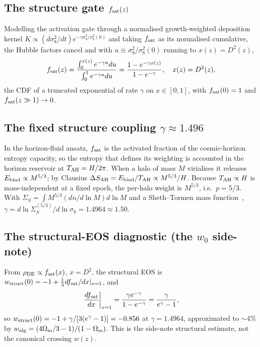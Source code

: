 \subsection{The structure gate $f_{\mathrm{sat}}(z)$}
Modelling the activation gate through a normalised growth-weighted deposition kernel $K\propto
(d\sigma_8^2/dt)e^{-\gamma\sigma_8^2/\sigma_8^2(0)}$ and taking $f_{\mathrm{sat}}$ as its normalised cumulative,
the Hubble factors cancel and with $u\equiv\sigma_8^2/\sigma_8^2(0)$ running to $x(z)=D^2(z)$,
\begin{equation}
f_{\mathrm{sat}}(z)=\frac{\int_0^{x(z)}e^{-\gamma u}du}{\int_0^1 e^{-\gamma u}du}
=\frac{1-e^{-\gamma x(z)}}{1-e^{-\gamma}},\quad x(z)=D^2(z),
\end{equation}
the CDF of a truncated exponential of rate $\gamma$ on $x\in[0,1]$, with $f_{\mathrm{sat}}(0)=1$ and
$f_{\mathrm{sat}}(z\gg1)\to0$.

\subsection{The fixed structure coupling $\gamma\approx1.496$}
In the horizon-fluid ansatz, $f_{\mathrm{sat}}$ is the activated fraction of the cosmic-horizon entropy capacity,
so the entropy that defines its weighting is accounted in the horizon reservoir at $T_{\mathrm{AH}}=H/2\pi$. When a
halo of mass $M$ virialises it releases $E_{\rm bind}\propto M^{5/3}$; by Clausius $\Delta S_{\rm
AH}=E_{\rm bind}/T_{\mathrm{AH}}\propto M^{5/3}/H$. Because $T_{\mathrm{AH}}\propto H$ is mass-independent at a fixed epoch,
the per-halo weight is $M^{5/3}$, i.e.\ $p=5/3$. With $\Sigma_S=\int M^{5/3}(dn/d\ln M)d\ln M$ and a
Sheth--Tormen mass function~\cite{Sheth:1999mn},
$\gamma=d\ln\Sigma_S^{(5/3)}/d\ln\sigma_8=1.4964\approx1.50$.

\subsection{The structural-EOS diagnostic (the $w_0$ side-note)}
From $\rho_{\mathrm{DE}}\propto f_{\mathrm{sat}}(x)$, $x=D^2$, the structural EOS is $w_{\rm
struct}(0)=-1+\tfrac13 df_{\rm sat}/dx|_{x=1}$, and
\begin{equation}
\left.\frac{df_{\rm sat}}{dx}\right|_{x=1}=\frac{\gamma e^{-\gamma}}{1-e^{-\gamma}}=\frac{\gamma}{e^\gamma-1},
\end{equation}
so $w_{\rm struct}(0)=-1+\gamma/[3(e^\gamma-1)]=-0.856$ at $\gamma=1.4964$, approximated to $\sim4\%$ by
$w_{\rm alg}=(4\Omega_{\mathrm m}/3-1)/(1-\Omega_{\mathrm m})$. This is the side-note structural estimate, not the canonical crossing
$w(z)$.

